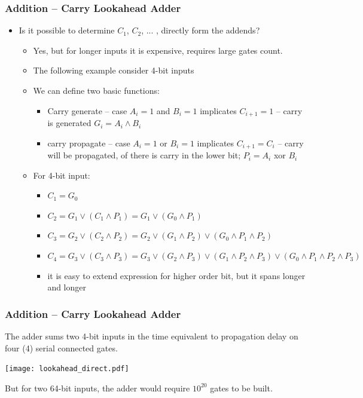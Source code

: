 \documentclass{beamer}
\begin{document}
\begin{frame}
\frametitle{Addition -- Carry Lookahead Adder}

\begin{itemize}
\item Is it possible to determine $C_1$, $C_2$, ... , directly form the addends?
\begin{itemize}
\item Yes, but for longer inputs it is expensive, requires large gates count.
\item The following example consider 4-bit inputs
\item We can define two basic functions:
\begin{itemize}
\item Carry generate -- case $A_i=1$ and $B_i=1$ implicates $C_{i+1}=1$ -- carry is generated $G_i=A_i \land B_i$ 
\item carry propagate -- case $A_i=1$ or $B_i=1$ implicates $C_{i+1}=C_{i}$ -- carry will be propagated, of there is carry in the lower bit; $P_i=A_i$ xor $B_i$ 
\end{itemize}
\item For 4-bit input:
\begin{itemize}
\item $C_1=G_0$ 
\item $C_2=G_1 \lor (C_1 \land P_1)= G_1 \lor (G_0 \land P_1)$
\item $C_3=G_2 \lor (C_2 \land P_2)= G_2 \lor (G_1 \land P_2) \lor (G_0 \land P_1 \land P_2)$ 
\item $C_4=G_3 \lor (C_3 \land P_3)= G_3 \lor (G_2 \land P_3) \lor (G_1 \land P_2 \land P_3) \lor (G_0 \land P_1 \land P_2 \land P_3)$
\item it is easy to extend expression for higher order bit, but it spans longer and longer
\end{itemize}
\end{itemize}
\end{itemize}

\end{frame}

\begin{frame}
\frametitle{Addition -- Carry Lookahead Adder}

The adder sums two 4-bit inputs in the time equivalent to propagation delay on four (4) serial connected gates.

\begin{center}
   \texttt{[image: lookahead\_direct.pdf]}
\end{center}

But for two 64-bit inputs, the adder would require $10^{20}$ gates to be built.
\end{frame}
\end{document}
